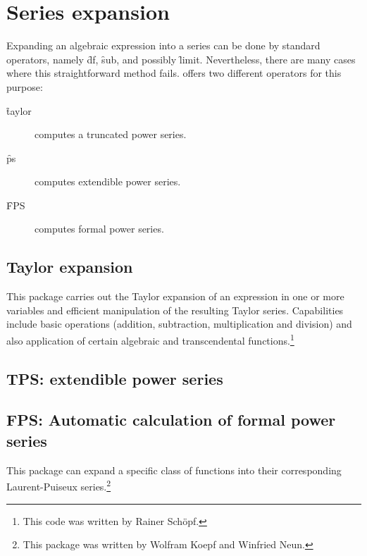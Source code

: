 \chapter{Series expansion}

Expanding an algebraic expression into a series can be done by standard \REDUCE operators, namely \f{df}, \f{sub}, and possibly \f{limit}.
Nevertheless, there are many cases where this straightforward method fails.
\REDUCE offers two different operators for this purpose:
\begin{description}
\item[\f{taylor}] computes a truncated power series.
\item[\f{ps}] computes extendible power series.
  \item[\f{FPS}] computes formal power series.
\end{description}

\section{Taylor expansion}
This package carries out the Taylor expansion of an expression in one
or more variables and efficient manipulation of the resulting Taylor
series. Capabilities include basic operations (addition, subtraction,
multiplication and division) and also application of certain algebraic
and transcendental functions.\footnote{This code was written by Rainer Schöpf.}



\section{TPS: extendible power series}


\newpage

\section{FPS: Automatic calculation of formal power series}

This package can expand a specific class of functions into their
corresponding Laurent-Puiseux series.\footnote{This package was written by Wolfram Koepf and Winfried Neun.}



